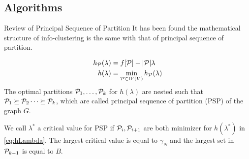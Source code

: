 \documentclass[notheorems]{beamer}
\begin{document}
\subsection{Algorithms}
\frame{\tableofcontents[currentsection]}
\begin{frame}{Review of Principal Sequence of Partition}
It has been found the mathematical structure of info-clustering is the same with that of principal sequence of partition.
\begin{definition}
\begin{align}
h_{\P}(\lambda) &=  f[\P] - \abs{\P} \lambda  \label{eq:hPL}\\
h(\lambda) &= \min_{\P \in \Pi'(V)} h_{\P}(\lambda) \label{eq:hLambda}
\end{align}
The optimal partitions $\P_1, \dots, \P_k$ for $h(\lambda)$ are nested such that $\P_1 \succeq \P_2 \dots \succeq \P_k$,  which are called principal sequence of partition (PSP) of the graph $G$.
\end{definition}
We call $\lambda^*$ a critical value for PSP if $\P_i, \P_{i+1}$ are both minimizer for $h(\lambda^*)$ in \eqref{eq:hLambda}.
The largest critical value is equal to $\gamma_N$ and the largest set in $\P_{k-1}$ is equal to $B$.
\end{frame}
\end{document}
